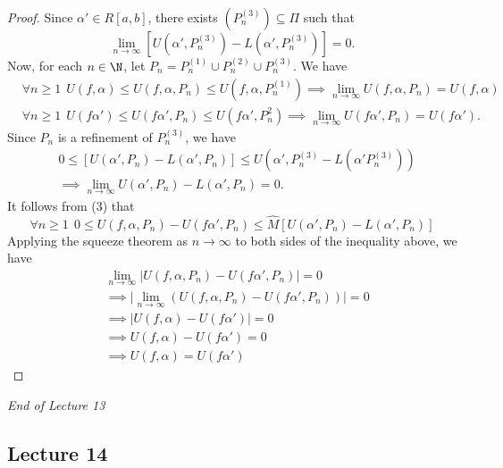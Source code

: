 \begin{proof}
Since \( \alpha' \in R[a,b] \), there exists \( ({P}_{n}^{(3)}) \subseteq \Pi  \) such that 
\[  \lim_{ n \to \infty } [U(\alpha', {P}_{n}^{(3)}) - L(\alpha', {P}_{n}^{(3)})]  = 0.   \]
Now, for each \( n \in \N \), let \( {P}_{n} = {P}_{n}^{(1)} \cup {P}_{n}^{(2)} \cup {P}_{n}^{(3)} \). We have
\begin{align*}
    &\forall n \geq 1 \ \  U(f,\alpha) \leq U(f,\alpha,{P}_{n}) \leq U(f,\alpha, {P}_{n}^{(1)}) \implies \lim_{ n \to \infty  } U(f,\alpha, {P}_{n})  = U(f,\alpha) \tag{4} \\
    &\forall n \geq 1 \ \ U(f \alpha') \leq U(f \alpha' , {P}_{n}) \leq U(f \alpha' , {P}_{n}^{2}) \implies \lim_{ n \to \infty  }  U(f \alpha', {P}_{n}) = U(f \alpha'). \tag{5}
\end{align*}
Since \( {P}_{n} \) is a refinement of \( {P}_{n}^{(3)} \), we have
\begin{align*}
     &0 \leq [U(\alpha', {P}_{n}) - L(\alpha',{P}_{n})] \leq U(\alpha' , {P}_{n}^{(3)} - L(\alpha' {P}_{n}^{(3)})) \\
     &\implies \lim_{ n \to \infty  } U(\alpha', {P}_{n}) - L(\alpha', {P}_{n}) = 0. \tag{6} 
\end{align*}
It follows from (3) that
\[  \forall n \geq 1 \ \ 0 \leq U(f,\alpha, {P}_{n}) - U(f \alpha' , {P}_{n}) \leq \hat{M} [U(\alpha', {P}_{n}) - L(\alpha', {P}_{n})] \]
Applying the squeeze theorem as \( n \to \infty   \) to both sides of the inequality above, we have
\begin{align*}
&\lim_{ n \to \infty   } | U(f,\alpha, {P}_{n}) - U(f \alpha' , {P}_{n}) |  = 0   \\
&\implies \Big| \lim_{ n \to \infty  }  (U(f,\alpha, {P}_{n}) - U(f \alpha', {P}_{n})) \Big| = 0 \\
&\implies | U(f,\alpha) - U(f \alpha') |  = 0 \\
&\implies U(f,\alpha) - U(f \alpha') = 0 \\
&\implies U(f,\alpha) = U(f \alpha')
\end{align*}
\end{proof}

\begin{center}
    \textit{End of Lecture 13} 
\end{center}

\subsection{Lecture 14}

